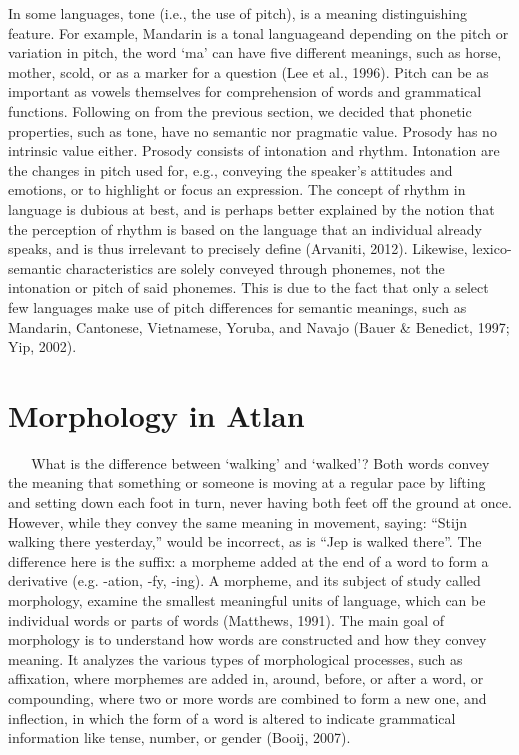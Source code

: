 \noindent In some languages, tone (i.e., the use of pitch), is a meaning distinguishing feature. For example, Mandarin is a tonal languageand depending on the pitch or variation in pitch, the word ‘ma’ can have five different meanings, such as horse, mother, scold, or as a marker for a question (Lee et al., 1996). Pitch can be as important as vowels themselves for comprehension of words and grammatical functions. Following on from the previous section, we decided that phonetic properties, such as tone, have no semantic nor pragmatic value. Prosody has no intrinsic value either. Prosody consists of intonation and rhythm. Intonation are the changes in pitch used for, e.g., conveying the speaker's attitudes and emotions, or to highlight or focus an expression. The concept of rhythm in language is dubious at best, and is perhaps better explained by the notion that the perception of rhythm is based on the language that an individual already speaks, and is thus irrelevant to precisely define (Arvaniti, 2012). Likewise, lexico-semantic characteristics are solely conveyed through phonemes, not the intonation or pitch of said phonemes. This is due to the fact that only a select few languages make use of pitch differences for semantic meanings, such as Mandarin, Cantonese, Vietnamese, Yoruba, and Navajo (Bauer \& Benedict, 1997; Yip, 2002). 
  
\section{Morphology in Atlan} 
  
\noindent What is the difference between ‘walking’ and ‘walked’? Both words convey the meaning that something or someone is moving at a regular pace by lifting and setting down each foot in turn, never having both feet off the ground at once. However, while they convey the same meaning in movement, saying: “Stijn walking there yesterday,” would be incorrect, as is “Jep is walked there”. The difference here is the suffix: a morpheme added at the end of a word to form a derivative (e.g. -ation, -fy, -ing). A morpheme, and its subject of study called morphology, examine the smallest meaningful units of language, which can be individual words or parts of words (Matthews, 1991). The main goal of morphology is to understand how words are constructed and how they convey meaning. It analyzes the various types of morphological processes, such as affixation, where morphemes are added in, around, before, or after a word, or compounding, where two or more words are combined to form a new one, and inflection, in which the form of a word is altered to indicate grammatical information like tense, number, or gender (Booij, 2007). 

